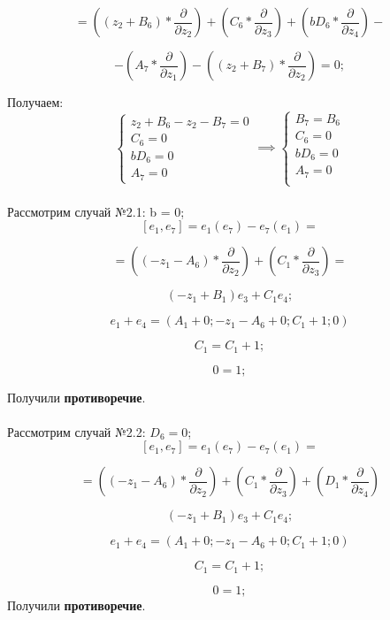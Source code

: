 \documentclass[12pt]{article}
\begin{document}
\[
= \left( (z_2 + B_6) * \frac{\partial}{\partial z_2} \right)
+ \left( C_6 * \frac{\partial}{\partial z_3} \right)
+ \left( bD_6 * \frac{\partial}{\partial z_4} \right) - 
\]

\[
- \left( A_7 * \frac{\partial}{\partial z_1} \right)
- \left( (z_2 + B_7) * \frac{\partial}{\partial z_2} \right) = 0;
\]

Получаем: \\
\[
\begin{cases}
z_2 + B_6 - z_2 - B_7 = 0 \\
C_6 = 0 \\
bD_6 = 0 \\
A_7 = 0
\end{cases}
\implies
\begin{cases}
B_7 = B_6 \\
C_6 = 0 \\
bD_6 = 0 \\
A_7 = 0 \\
\end{cases}
\]\\


Рассмотрим случай №2.1: b = 0; \\

\[
[e_1, e_7] = e_1(e_7) - e_7(e_1) = 
\]

\[
= \left( (-z_1 - A_6) * \frac{\partial}{\partial z_2} \right)
+ \left( C_1 * \frac{\partial}{\partial z_3} \right) =
\]

\[
(-z_1 + B_1)e_3 + C_1e_4;
\]

\[
e_1 + e_4 = \left(A_1 + 0; -z_1 - A_6 + 0; C_1 + 1; 0 \right)
\]

\[
C_1 = C_1 + 1;
\]

\[
0 = 1;
\]

Получили \textbf{противоречие}.\\\\
Рассмотрим случай №2.2: $D_6 = 0$; \\

\[
[e_1, e_7] = e_1(e_7) - e_7(e_1) = 
\]

\[
= \left( (-z_1 - A_6) * \frac{\partial}{\partial z_2} \right)
+ \left( C_1 * \frac{\partial}{\partial z_3} \right)
+ \left( D_1 * \frac{\partial}{\partial z_4} \right)
\]

\[
(-z_1 + B_1)e_3 + C_1e_4;
\]

\[
e_1 + e_4 = \left(A_1 + 0; -z_1 - A_6 + 0; C_1 + 1; 0 \right)
\]

\[
C_1 = C_1 + 1;
\]

\[
0 = 1;
\]
Получили \textbf{противоречие}. \\
\end{document}
